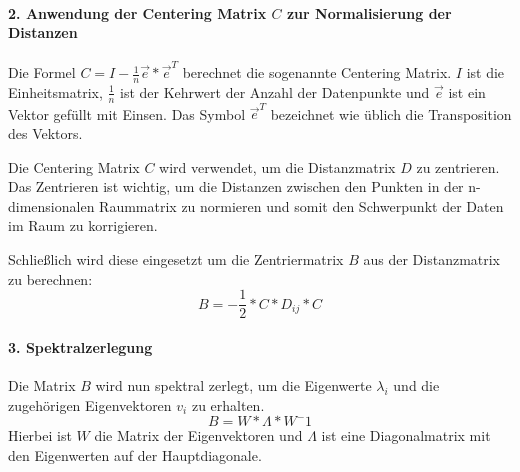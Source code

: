 \paragraph*{2. Anwendung der Centering Matrix $ C $ zur Normalisierung der
Distanzen}
Die Formel $ C = I - \frac{1}{n} \vec{e} * \vec{e}^T $ berechnet die
sogenannte Centering Matrix. $ I $ ist die Einheitsmatrix, $ \frac{1}{n} $ ist
der Kehrwert der Anzahl der Datenpunkte und $ \vec{e} $ ist ein Vektor gefüllt
mit Einsen. Das Symbol $ \vec{e}^T $ bezeichnet wie üblich die Transposition
des Vektors.

Die Centering Matrix $ C $ wird verwendet, um die Distanzmatrix $ D $ zu
zentrieren. Das Zentrieren ist wichtig, um die Distanzen zwischen den Punkten
in der n-dimensionalen Raummatrix zu normieren und somit den Schwerpunkt der
Daten im Raum zu korrigieren.

Schließlich wird diese eingesetzt um die Zentriermatrix $ B $ aus der
Distanzmatrix zu berechnen:
$$ B = - \frac{1}{2} * C * D_{ij} * C $$

\paragraph*{3. Spektralzerlegung}
Die Matrix $ B $ wird nun spektral zerlegt, um die Eigenwerte $ \lambda_{i} $
und die zugehörigen Eigenvektoren $ v_{i} $ zu erhalten.
$$ B = W * \Lambda * W^-1 $$
Hierbei ist $ W $ die Matrix der Eigenvektoren und $ \Lambda $ ist eine
Diagonalmatrix mit den Eigenwerten auf der Hauptdiagonale.